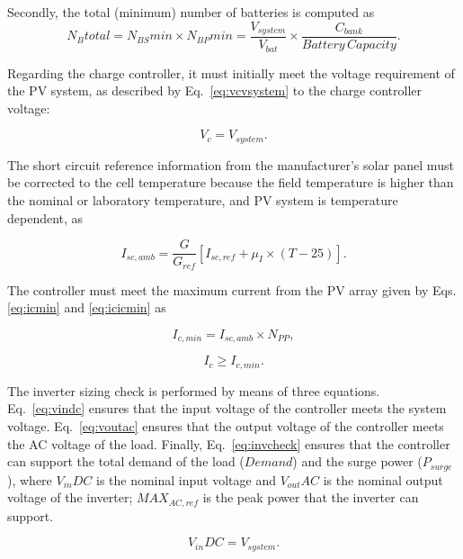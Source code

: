\documentclass[runningheads]{llncs}
\begin{document}
Secondly, the total (minimum) number of batteries is computed as 
\begin{equation}
\label{eq:Nbtotal}
N_{B}total = N_{BS}min \times N_{BP}min = \frac{V_{system}}{V_{bat}} \times \frac{C_{bank}}{Battery \, Capacity}.
\end{equation}

Regarding the charge controller, it must initially meet the voltage requirement of the PV system, as described by Eq.~\ref{eq:vcvsystem} to the charge controller voltage: 

\begin{equation}
\label{eq:vcvsystem}
V_{c} = V_{system}.
\end{equation}

The short circuit reference information from the manufacturer's solar panel must be corrected to the cell temperature because the field temperature is higher than the nominal or laboratory temperature, and PV system is temperature dependent, as 

\begin{equation}
\label{eq:iscamb}
I_{sc,amb} = \frac{G}{G_{ref}} \left[I_{sc,ref} +  \mu_{I} \times (T-25) \right]. 
\end{equation}

The controller must meet the maximum current from the PV array given by Eqs. \ref{eq:icmin} and \ref{eq:icicmin} as

\begin{equation}
\label{eq:icmin}
I_{c,min} = I_{sc,amb} \times N_{PP},
\end{equation}

\begin{equation}
\label{eq:icicmin}
I_{c} \geq I_{c,min}.
\end{equation}

The inverter sizing check is performed by means of three equations. Eq.~\ref{eq:vindc} ensures that the input voltage of the controller meets the system voltage. Eq.~\ref{eq:voutac} ensures that the output voltage of the controller meets the AC voltage of the load. Finally, Eq.~\ref{eq:invcheck} ensures that the controller can support the total demand of the load ($Demand$) and the surge power ($P_{surge}$), where $V_{in}DC$ is the nominal input voltage and $V_{out}AC$ is the nominal output voltage of the inverter; $MAX_{AC,ref}$ is the peak power that the inverter can support.

\begin{equation}
\label{eq:vindc} 
V_{in}DC = V_{system}.
\end{equation}
\end{document}
